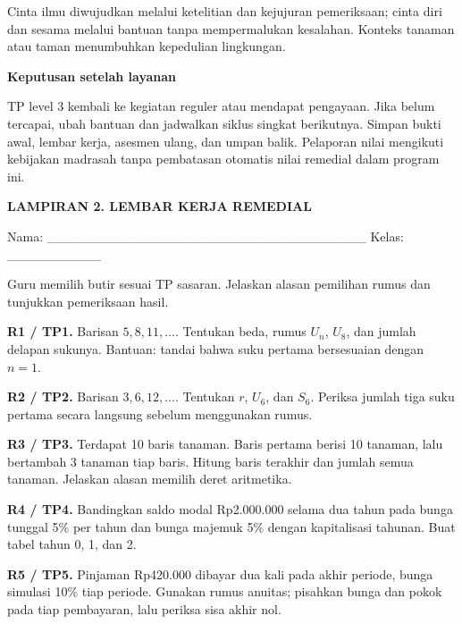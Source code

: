 \documentclass[11pt,a4paper]{article}
\begin{document}
{\small Cinta ilmu diwujudkan melalui ketelitian dan kejujuran pemeriksaan; cinta diri dan sesama melalui bantuan tanpa mempermalukan kesalahan. Konteks tanaman atau taman menumbuhkan kepedulian lingkungan.\par}\medskip
\par\medskip\noindent\textbf{Keputusan setelah layanan}\par\smallskip
{\small TP level 3 kembali ke kegiatan reguler atau mendapat pengayaan. Jika belum tercapai, ubah bantuan dan jadwalkan siklus singkat berikutnya. Simpan bukti awal, lembar kerja, asesmen ulang, dan umpan balik. Pelaporan nilai mengikuti kebijakan madrasah tanpa pembatasan otomatis nilai remedial dalam program ini.\par}\medskip
\clearpage
\begin{center}\bfseries\large LAMPIRAN 2. LEMBAR KERJA REMEDIAL\end{center}\medskip
{\small Nama: \_\_\_\_\_\_\_\_\_\_\_\_\_\_\_\_\_\_\_\_\_\_\_\_\_\_\_\_\_\_\_\_\_\_  Kelas: \_\_\_\_\_\_\_\_\_\_\par}\medskip
{\small Guru memilih butir sesuai TP sasaran. Jelaskan alasan pemilihan rumus dan tunjukkan pemeriksaan hasil.\par}\medskip
\noindent\textbf{R1 / TP1.} Barisan \(5,8,11,\ldots\). Tentukan beda, rumus \(U_n\), \(U_8\), dan jumlah delapan sukunya. Bantuan: tandai bahwa suku pertama bersesuaian dengan \(n=1\).\par\vspace{10mm}
\noindent\textbf{R2 / TP2.} Barisan \(3,6,12,\ldots\). Tentukan \(r\), \(U_6\), dan \(S_6\). Periksa jumlah tiga suku pertama secara langsung sebelum menggunakan rumus.\par\vspace{10mm}
\noindent\textbf{R3 / TP3.} Terdapat 10 baris tanaman. Baris pertama berisi 10 tanaman, lalu bertambah 3 tanaman tiap baris. Hitung baris terakhir dan jumlah semua tanaman. Jelaskan alasan memilih deret aritmetika.\par\vspace{10mm}
\noindent\textbf{R4 / TP4.} Bandingkan saldo modal Rp2.000.000 selama dua tahun pada bunga tunggal 5\% per tahun dan bunga majemuk 5\% dengan kapitalisasi tahunan. Buat tabel tahun 0, 1, dan 2.\par\vspace{10mm}
\noindent\textbf{R5 / TP5.} Pinjaman Rp420.000 dibayar dua kali pada akhir periode, bunga simulasi 10\% tiap periode. Gunakan rumus anuitas; pisahkan bunga dan pokok pada tiap pembayaran, lalu periksa sisa akhir nol.\par\vspace{10mm}
\end{document}
